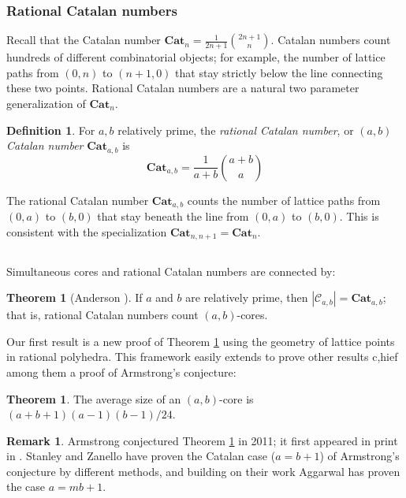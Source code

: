 \documentclass{amsart}[12pt]
\theoremstyle{definition}
\newtheorem{theorem}[dummy]{Theorem}
\newtheorem{definition}[dummy]{Definition}
\newtheorem{remark}[dummy]{Remark}
\newcommand{\Cat}{\mathbf{Cat}}
\begin{document}
\subsubsection{Rational Catalan numbers}
Recall that the Catalan number $\Cat_n=\frac{1}{2n+1}\binom{2n+1}{n}$. Catalan numbers count hundreds of different combinatorial objects; for example, the number of lattice paths from $(0,n)$ to $(n+1,0)$ that stay strictly below the line connecting these two points.
Rational Catalan numbers are a natural two parameter generalization of $\Cat_n$.
\begin{definition}
For $a,b$ relatively prime, the \emph{rational Catalan number}, or \emph{$(a,b)$ Catalan number} $\Cat_{a,b}$ is
$$\Cat_{a,b}=\frac{1}{a+b}\binom{a+b}{a}$$
\end{definition}
The rational Catalan number $\Cat_{a,b}$ counts the number of lattice paths from $(0,a)$ to $(b,0)$ that stay beneath the line from $(0,a)$ to $(b,0)$. This is consistent with the specialization $\Cat_{n,n+1}=\Cat_n$.




\subsection{}
Simultaneous cores and rational Catalan numbers are connected by:
\begin{theorem}[Anderson \cite{anderson}] \label{thm:anderson}
If $a$ and $b$ are relatively prime, then $|\mathcal{C}_{a,b}|=\Cat_{a,b}$; that is, rational Catalan numbers count $(a,b)$-cores.
\end{theorem}


Our first result is a new proof of Theorem \ref{thm:anderson} using the geometry of lattice points in rational polyhedra.  This framework easily extends to prove other results c,hief among them a proof of Armstrong's conjecture:


\begin{theorem} \label{thm:armstrong}
The average size of an $(a,b)$-core is $(a+b+1)(a-1)(b-1)/24$.
\end{theorem}

\begin{remark}
 Armstrong conjectured Theorem \ref{thm:armstrong} in 2011; it first appeared in print in \cite{AHJ}.
Stanley and Zanello \cite{SZ} have proven the Catalan case ($a=b+1$) of Armstrong's conjecture by different methods, and building on their work Aggarwal \cite{Aggarwal} has proven the case $a=mb+1$.
\end{remark}
\end{document}
